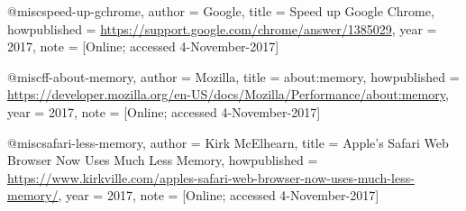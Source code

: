       @misc{speed-up-gchrome,
        author = {Google},
        title = {{Speed up Google Chrome}},
        howpublished = {\url{https://support.google.com/chrome/answer/1385029}},
        year = {2017},
        note = {[Online; accessed 4-November-2017]}
      }

      @misc{ff-about-memory,
        author = {Mozilla},
        title = {{about:memory}},
        howpublished = {\url{https://developer.mozilla.org/en-US/docs/Mozilla/Performance/about:memory}},
        year = {2017},
        note = {[Online; accessed 4-November-2017]}
      }

      @misc{safari-less-memory,
        author = {Kirk McElhearn},
        title = {{Apple's Safari Web Browser Now Uses Much Less Memory}},
        howpublished = {\url{https://www.kirkville.com/apples-safari-web-browser-now-uses-much-less-memory/}},
        year = {2017},
        note = {[Online; accessed 4-November-2017]}
      }

      
